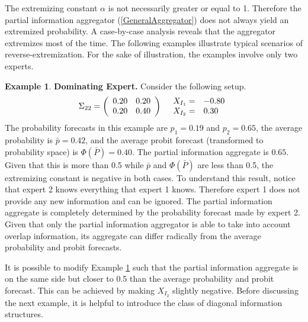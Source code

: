 \documentclass[11pt,twoside]{article}
\theoremstyle{definition}
\newtheorem{example}[theorem]{Example}
\theoremstyle{definition}
\begin{document}
The extremizing constant $\alpha$ is not necessarily greater or equal to 1. Therefore the partial information aggregator (\ref{GeneralAggregator}) does not always yield an extremized probability. A case-by-case analysis reveals that the aggregator extremizes most of the time. The following examples illustrate typical scenarios of reverse-extremization. For the sake of illustration, the examples involve only two experts. 



\begin{example}
\label{Example1}
\textbf{Dominating Expert.} Consider the following setup.
\begin{align*}
\Sigma_{22} =  \left(\begin{array}{c c}
0.20 & 0.20\\
0.20 & 0.40 \\
 \end{array}\right)
  && 
  \begin{array}{l l}
X_{I_1} =& -0.80\\
X_{I_2} =& 0.30
 \end{array}
\end{align*}
The probability forecasts in this example are $p_1 = 0.19$ and $p_2 = 0.65$, the average probability is $\bar{p} = 0.42$, and the average probit forecast (transformed to probability space) is $\Phi(\bar{P}) = 0.40$. 
The partial information aggregate is $0.65$.  Given that this is more than 0.5 while $\bar{p}$ and $\Phi(\bar{P})$ are less than 0.5, the extremizing constant is negative in both cases. To understand this result, notice that expert 2 knows everything that expert 1 knows. Therefore expert 1 does not provide any new information and can be ignored. The partial information aggregate is completely determined by the probability forecast made by expert 2. Given that only the partial information aggregator is able to take into account overlap information, its aggregate can differ radically from the average probability and probit forecasts. 
\end{example}
It is possible to modify Example \ref{Example1} such that the partial information aggregate is on the same side but closer to 0.5 than the average probability and probit forecast. This can be achieved by making $X_{I_2}$ slightly negative. Before discussing the next example, it is helpful to introduce the class of diagonal information structures. 
\end{document}
